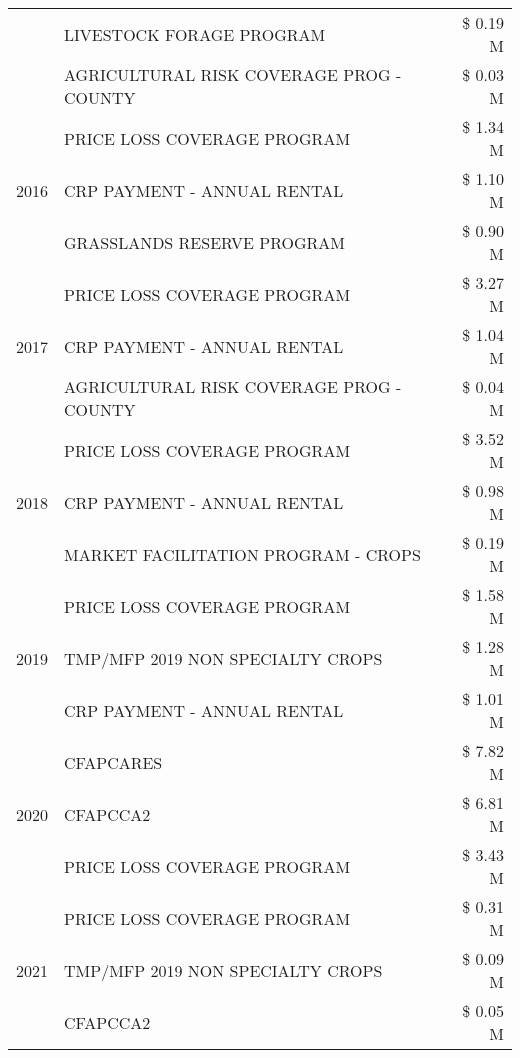 \begin{tabular}{llr}
 & LIVESTOCK FORAGE PROGRAM & \$ 0.19 M \\
 & AGRICULTURAL RISK COVERAGE PROG - COUNTY & \$ 0.03 M \\
\cline{1-3}
\multirow[t]{3}{*}{2016} & PRICE LOSS COVERAGE PROGRAM                   & \$ 1.34 M \\
 & CRP PAYMENT - ANNUAL RENTAL                   & \$ 1.10 M \\
 & GRASSLANDS RESERVE PROGRAM                    & \$ 0.90 M \\
\cline{1-3}
\multirow[t]{3}{*}{2017} & PRICE LOSS COVERAGE PROGRAM & \$ 3.27 M \\
 & CRP PAYMENT - ANNUAL RENTAL & \$ 1.04 M \\
 & AGRICULTURAL RISK COVERAGE PROG - COUNTY & \$ 0.04 M \\
\cline{1-3}
\multirow[t]{3}{*}{2018} & PRICE LOSS COVERAGE PROGRAM & \$ 3.52 M \\
 & CRP PAYMENT - ANNUAL RENTAL & \$ 0.98 M \\
 & MARKET FACILITATION PROGRAM - CROPS & \$ 0.19 M \\
\cline{1-3}
\multirow[t]{3}{*}{2019} & PRICE LOSS COVERAGE PROGRAM & \$ 1.58 M \\
 & TMP/MFP 2019 NON SPECIALTY CROPS & \$ 1.28 M \\
 & CRP PAYMENT - ANNUAL RENTAL & \$ 1.01 M \\
\cline{1-3}
\multirow[t]{3}{*}{2020} & CFAPCARES & \$ 7.82 M \\
 & CFAPCCA2 & \$ 6.81 M \\
 & PRICE LOSS COVERAGE PROGRAM & \$ 3.43 M \\
\cline{1-3}
\multirow[t]{3}{*}{2021} & PRICE LOSS COVERAGE PROGRAM & \$ 0.31 M \\
 & TMP/MFP 2019 NON SPECIALTY CROPS & \$ 0.09 M \\
 & CFAPCCA2 & \$ 0.05 M \\
\cline{1-3}
\bottomrule
\end{tabular}
